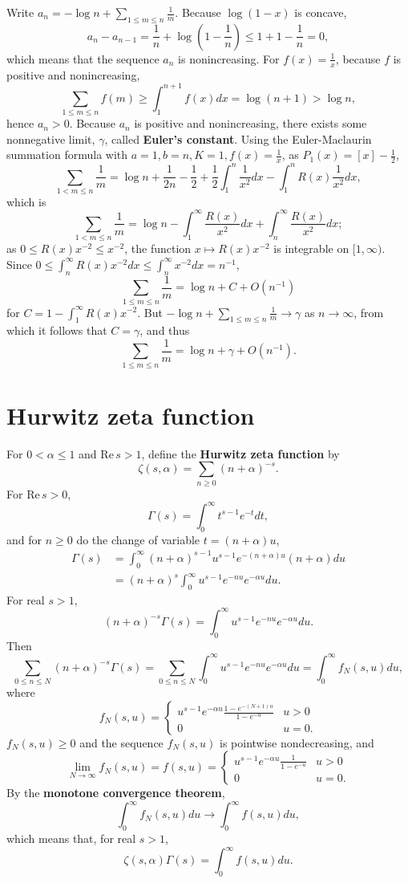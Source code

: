 \documentclass{article}
\def\Re{\ensuremath{\mathrm{Re}}\,}
\theoremstyle{definition}
\begin{document}
Write $a_n  = - \log n+ \sum_{1 \leq m \leq n} \frac{1}{m}$. Because $\log(1-x)$ is concave,
\[
a_n - a_{n-1} = \frac{1}{n} + \log\left(1-\frac{1}{n} \right) \leq 1 + 1 - \frac{1}{n}=0,
\] 
which means that the sequence $a_n$ is nonincreasing. For $f(x)=\frac{1}{x}$, because
$f$ is positive and nonincreasing,
\[
\sum_{1 \leq m \leq n} f(m) \geq \int_1^{n+1} f(x) dx = \log(n+1) > \log n,
\]
hence $a_n>0$. Because $a_n$ is positive and nonincreasing, there exists some nonnegative limit,
$\gamma$, called \textbf{Euler's constant}. 
Using the Euler-Maclaurin summation formula with $a=1, b=n, K=1, f(x)=\frac{1}{x}$, as $P_1(x) = [x]-\frac{1}{2}$,
\[
\sum_{1 < m \leq n} \frac{1}{m} = \log n + \frac{1}{2n} - \frac{1}{2} + \frac{1}{2} \int_1^n \frac{1}{x^2} dx - \int_1^n R(x) \frac{1}{x^2} dx,
\]
which is
\[
\sum_{1<m \leq n} \frac{1}{m} = \log n - \int_1^\infty \frac{R(x)}{x^2} dx + \int_n^\infty \frac{R(x)}{x^2} dx;
\]
as $0 \leq R(x) x^{-2} \leq x^{-2}$, the function $x \mapsto R(x)x^{-2}$ is integrable
on $[1,\infty)$. Since $0 \leq \int_n^\infty R(x)x^{-2} dx \leq \int_n^\infty x^{-2} dx = n^{-1}$, 
\[
\sum_{1 \leq m \leq n} \frac{1}{m} = \log n + C + O(n^{-1})
\]
for $C=1-\int_1^\infty R(x)x^{-2}$. But $-\log n + \sum_{1 \leq m \leq n} \frac{1}{m} \to \gamma$ as $n \to \infty$, from which it follows that
$C=\gamma$, and thus
\[
\sum_{1 \leq m \leq n} \frac{1}{m} = \log n + \gamma + O(n^{-1}).
\]



\section{Hurwitz zeta function}
For $0<\alpha \leq 1$ and $\Re s>1$, define the \textbf{Hurwitz zeta function} by
\[
\zeta(s,\alpha) = \sum_{n \geq 0} (n+\alpha)^{-s}.
\]
For $\Re s>0$,
\[
\Gamma(s) = \int_0^\infty t^{s-1} e^{-t} dt,
\]
and for $n \geq 0$ do the change of variable $t = (n+\alpha) u$,
\begin{align*}
\Gamma(s) &= \int_0^\infty (n+\alpha)^{s-1} u^{s-1} e^{-(n+\alpha)u} (n+\alpha) du\\
&=(n+\alpha)^s \int_0^\infty u^{s-1} e^{-nu} e^{-\alpha u} du.
\end{align*}
For real $s>1$,
\[
(n+\alpha)^{-s} \Gamma(s) = \int_0^\infty u^{s-1} e^{-nu} e^{-\alpha u} du.
\]
Then
\[
\sum_{0 \leq n \leq N} (n+\alpha)^{-s} \Gamma(s) = \sum_{0 \leq n \leq N}\int_0^\infty u^{s-1} e^{-nu} e^{-\alpha u} du=\int_0^\infty f_N(s,u) du,
\]
where
\[
f_N(s,u) = \begin{cases}
u^{s-1} e^{-\alpha u} \frac{1-e^{-(N+1)u}}{1-e^{-u}} &u>0\\
0&u=0.
\end{cases}
\]
$f_N(s,u) \geq 0$ and the sequence $f_N(s,u)$ is pointwise nondecreasing, and
\[
\lim_{N \to \infty} f_N(s,u) =  f(s,u) = \begin{cases}
u^{s-1} e^{-\alpha u} \frac{1}{1-e^{-u}} &u>0\\
0&u=0.
\end{cases}
\]
By the \textbf{monotone convergence theorem},
\[
\int_0^\infty f_N(s,u) du \to \int_0^\infty f(s,u)du,
\]
which means that, for real $s>1$,
\[
\zeta(s,\alpha) \Gamma(s) = \int_0^\infty f(s,u) du.
\]
\end{document}
